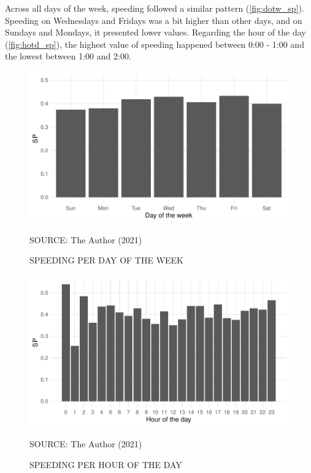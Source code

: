 
Across all days of the week, speeding followed a similar pattern (\autoref{fig:dotw_sp}). Speeding on Wednesdays and Fridays was a bit higher than other days, and on Sundays and Mondays, it presented lower values. Regarding the hour of the day (\autoref{fig:hotd_sp}), the highest value of speeding happened between 0:00 - 1:00 and the lowest between 1:00 and 2:00. 

\begin{figure}[!htbp]
    \centering\footnotesize
    \captionsetup{font=footnotesize}
    \caption{SPEEDING PER DAY OF THE WEEK}
    \includegraphics{fig/dotw_sp.pdf}
    \label{fig:dotw_sp}
    \par SOURCE: The Author (2021)
\end{figure}

\begin{figure}[!htbp]
    \centering\footnotesize
    \captionsetup{font=footnotesize}
    \caption{SPEEDING PER HOUR OF THE DAY}
    \includegraphics{fig/hotd_sp.pdf}
    \label{fig:hotd_sp}
    \par SOURCE: The Author (2021)
\end{figure}

